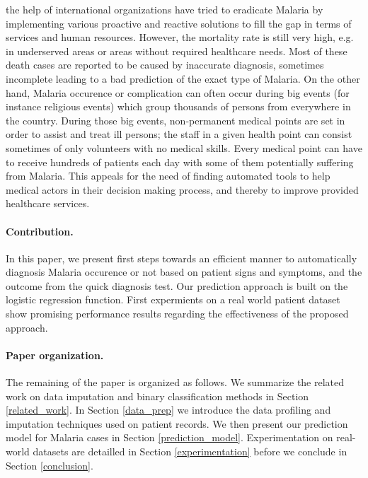 the help of international organizations have tried to eradicate Malaria by implementing various proactive and reactive solutions 
to fill the gap in terms of services and human resources. However, the mortality rate is still very high, e.g. in underserved areas
or areas without required healthcare needs. Most of these death cases are reported to be caused by inaccurate diagnosis, sometimes 
incomplete leading to a bad prediction of the exact type of Malaria.
On the other hand, Malaria occurence or complication can often occur  during  big events (for instance religious events)
which group thousands of persons from everywhere in the country. During those big events, non-permanent medical points are set in order
to assist and treat ill persons; the staff in a given health point can consist sometimes of only volunteers with no medical skills. Every medical 
point can have to receive hundreds of patients each day with some of them potentially suffering from Malaria. 
This appeals for the need of finding automated tools to help medical actors in their decision making process, and thereby to improve provided 
healthcare services.   
\paragraph*{Contribution.}
In this paper, we present first steps towards an efficient manner to automatically diagnosis Malaria occurence or not based on patient signs and symptoms,
and the outcome from the quick diagnosis test. Our prediction approach is built on the logistic regression function. First expermients on a real world 
patient dataset show promising performance results regarding the effectiveness of the proposed approach.
\paragraph*{Paper organization.}The remaining of the paper is organized as follows. We summarize the related work on data imputation and binary classification methods in Section \ref{related_work}.
In Section \ref{data_prep} we introduce the data profiling and imputation techniques used on patient records. We then present our prediction model for Malaria cases in Section \ref{prediction_model}.
Experimentation on real-world datasets are detailled in Section \ref{experimentation} before we conclude in Section \ref{conclusion}. 
